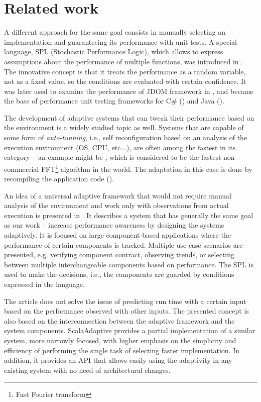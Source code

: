 \chapter{Related work}

A different approach for the same goal consists in manually selecting an implementation and guaranteeing its performance with unit tests. A special language, SPL (Stochastic Performance Logic), which allows to express assumptions about the performance of multiple functions, was introduced in \cite{bulej_capturing_2012}. The innovative concept is that it treats the performance as a random variable, not as a fixed value, so the conditions are evaluated with certain confidence. It was later used to examine the performance of JDOM framework in \cite{horky_performance_2013}, and became the base of performance unit testing frameworks for C\# (\cite{Trojanek:Thesis:2013}) and Java (\cite{Kotrc:Thesis:2015}).

The development of adaptive systems that can tweak their performance based on the environment is a widely studied topic as well. Systems that are capable of some form of \textit{auto-tunning}, i.e., self reconfiguration based on an analysis of the execution environment (OS, CPU, etc...), are often among the fastest in its category -- an example might be \cite{frigo_fftw:_1998},  which is considered to be the fastest non-commercial FFT\footnote{Fast Fourier transform} algorithm in the world. The adaptation in this case is done by recompiling the application code (\cite{frigo_fast_1999}).

An idea of a universal adaptive framework that would not require manual analysis of the environment and work only with observations from actual execution is presented in \cite{bulej_performance_2012}. It describes a system that has generally the same goal as our work -- increase performance awareness by designing the systems adaptively. It is focused on large component-based applications where the performance of certain components is tracked. Multiple use case scenarios are presented, e.g. verifying component contract, observing trends, or selecting between multiple interchangeable components based on performance. The SPL is used to make the decisions, i.e., the components are guarded by conditions expressed in the language.

The article does not solve the issue of predicting run time with a certain input based on the performance observed with other inputs. The presented concept is also based on the interconnection between the adaptive framework and the system components. ScalaAdaptive provides a partial implementation of a similar system, more narrowly focused, with higher emphasis on the simplicity and efficiency of performing the single task of selecting faster implementation. In addition, it provides an API that allows easily using the adaptivity in any existing system with no need of architectural changes.

